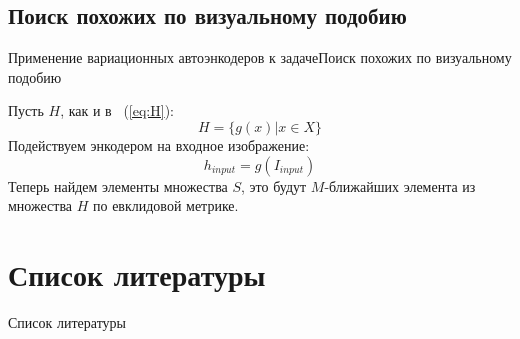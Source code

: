 \documentclass{beamer}
\begin{document}
\subsection{Поиск похожих по визуальному подобию}

\begin{frame}{Применение вариационных автоэнкодеров к задаче}{Поиск похожих по визуальному подобию}

Пусть $H$, как и в ~(\ref{eq:H}): $$H = \{g(x) | x \in X\}$$
Подействуем энкодером на входное изображение: $$h_{input} = g(I_{input})$$
Теперь найдем элементы множества $S$, это будут $M$-ближайших элемента из множества $H$ по евклидовой метрике.

\end{frame}

\section{Список литературы}

\begin{frame}{Список литературы}
	
	
	\nocite{*}
\end{frame}
\end{document}
